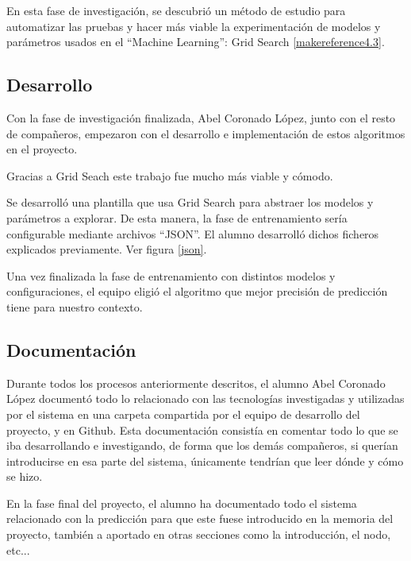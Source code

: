 En esta fase de investigación, se descubrió un método de estudio para automatizar las pruebas y hacer más viable la experimentación de modelos y parámetros usados en el ``Machine Learning'': Grid Search \ref{makereference4.3}.

\subsection{Desarrollo}
Con la fase de investigación finalizada, Abel Coronado López, junto con el resto de compañeros, empezaron con el desarrollo e implementación de estos algoritmos en el proyecto.

Gracias a Grid Seach este trabajo fue mucho más viable y cómodo.

Se desarrolló una plantilla que usa Grid Search para abstraer los modelos y parámetros a explorar. De esta manera, la fase de entrenamiento sería configurable mediante archivos ``JSON''. El alumno desarrolló dichos ficheros explicados previamente. Ver figura \ref{json}.

Una vez finalizada la fase de entrenamiento con distintos modelos y configuraciones, el equipo eligió el algoritmo que mejor precisión de predicción tiene para nuestro contexto.

\subsection{Documentación}
Durante todos los procesos anteriormente descritos, el alumno Abel Coronado López documentó todo lo relacionado con las tecnologías investigadas y utilizadas por el sistema en una carpeta compartida por el equipo de desarrollo del proyecto, y en Github. Esta documentación consistía en comentar todo lo que se iba desarrollando e investigando, de forma que los demás compañeros, si querían introducirse en esa parte del sistema, únicamente tendrían que leer dónde y cómo se hizo.

En la fase final del proyecto, el alumno ha documentado todo el sistema relacionado con la predicción para que este fuese introducido en la memoria del proyecto, también a aportado en otras secciones como la introducción, el nodo, etc...